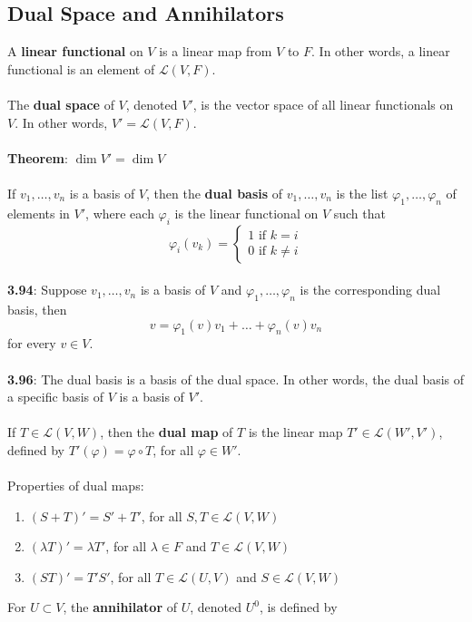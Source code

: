 \documentclass{article}
\DeclareMathOperator{\Dim}{dim}
\theoremstyle{definition}
\begin{document}
\subsection*{Dual Space and Annihilators}
A \textbf{linear functional} on $V$ is a linear map from $V$ to $F$. In other words, a linear functional is an element of $\mathcal{L}(V, F)$. \\ \\
The \textbf{dual space} of $V$, denoted $V'$, is the vector space of all linear functionals on $V$. In other words, $V' = \mathcal{L}(V, F)$. \\ \\
\textbf{Theorem}: $\Dim{V'} = \Dim{V}$ \\ \\
If $v_1, \dots, v_n$ is a basis of $V$, then the \textbf{dual basis} of $v_1, \dots, v_n$ is the list $\varphi_1, \dots, \varphi_n$ of elements in $V'$, where each $\varphi_i$ is the linear functional on $V$ such that $$\varphi_i(v_k) = \begin{cases} 1 \text{ if } k = i \\
0 \text{ if } k \neq i
\end{cases}$$ \\
\textbf{3.94}: Suppose $v_1, \dots, v_n$ is a basis of $V$ and $\varphi_1, \dots, \varphi_n$ is the corresponding dual basis, then $$v = \varphi_1(v)v_1 + \dots + \varphi_n(v)v_n$$ for every $v \in V$. \\ \\
\textbf{3.96}: The dual basis is a basis of the dual space. In other words, the dual basis of a specific basis of $V$ is a basis of $V'$. \\ \\
If $T \in \mathcal{L}(V, W)$, then the \textbf{dual map} of $T$ is the linear map $T' \in \mathcal{L}(W', V')$, defined by $T'(\varphi) = \varphi \circ T$, for all $\varphi \in W'$. \\ \\
Properties of dual maps: \begin{enumerate}
\item $(S + T)' = S' + T'$, for all $S, T \in \mathcal{L}(V, W)$
\item $(\lambda T)' = \lambda T'$, for all $\lambda \in F$ and $T \in \mathcal{L}(V, W)$
\item $(ST)' = T'S'$, for all $T \in \mathcal{L}(U, V)$ and $S \in \mathcal{L}(V, W)$
\end{enumerate} $ $ \\
For $U \subset V$, the \textbf{annihilator} of $U$, denoted $U^0$, is defined by \\
\end{document}
